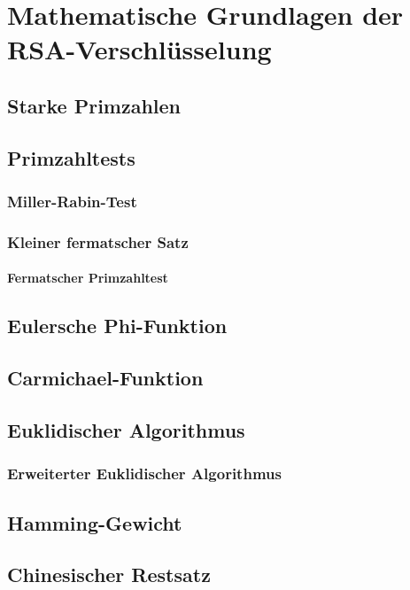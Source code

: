 \chapter{Mathematische Grundlagen der RSA-Verschlüsselung}

\section{Starke Primzahlen}
\newpage
\section{Primzahltests}
\subsection{Miller-Rabin-Test}

\newpage
\subsection{Kleiner fermatscher Satz}
\subsubsection{Fermatscher Primzahltest}
\newpage
\section{Eulersche Phi-Funktion}
\newpage
\section{Carmichael-Funktion}
\newpage
\section{Euklidischer Algorithmus}
\newpage
\subsection{Erweiterter Euklidischer Algorithmus}
\newpage
\section{Hamming-Gewicht}
\newpage
\section{Chinesischer Restsatz}

